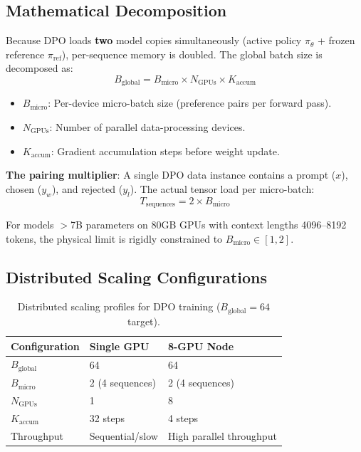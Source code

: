 \subsection{Mathematical Decomposition}
\label{mathematical-decomposition}

Because DPO loads \textbf{two} model copies simultaneously (active policy $\pi_\theta$ + frozen reference $\pi_{\text{ref}}$), per-sequence memory is doubled. The global batch size is decomposed as: 
\begin{equation}
\boxed{B_{\text{global}} = B_{\text{micro}} \times N_{\text{GPUs}} \times K_{\text{accum}}}
\end{equation}

\begin{itemize}
  \item $B_{\text{micro}}$: Per-device micro-batch size (preference pairs per forward pass).
  \item $N_{\text{GPUs}}$: Number of parallel data-processing devices.
  \item $K_{\text{accum}}$: Gradient accumulation steps before weight update.
\end{itemize}

\textbf{The pairing multiplier}: A single DPO data instance contains a prompt ($x$), chosen ($y_w$), and rejected ($y_l$). The actual tensor load per micro-batch: 
\begin{equation}
T_{\text{sequences}} = 2 \times B_{\text{micro}}
\end{equation}

For models $>$7B parameters on 80GB GPUs with context lengths 4096--8192 tokens, the physical limit is rigidly constrained to $B_{\text{micro}} \in [1, 2]$.

\subsection{Distributed Scaling Configurations}
\label{distributed-scaling-configurations}

\begin{table}[ht!]
\centering
\caption{Distributed scaling profiles for DPO training ($B_{\text{global}} = 64$ target).}
\begin{tabular}{@{}lp{5cm}p{8cm}@{}}
\toprule
\textbf{Configuration} & \textbf{Single GPU} & \textbf{8-GPU Node} \\
\midrule
$B_{\text{global}}$ & 64 & 64 \\
$B_{\text{micro}}$ & 2 (4 sequences) & 2 (4 sequences) \\
$N_{\text{GPUs}}$ & 1 & 8 \\
$K_{\text{accum}}$ & 32 steps & 4 steps \\
Throughput & Sequential/slow & High parallel throughput \\
\bottomrule
\end{tabular}
\end{table}

